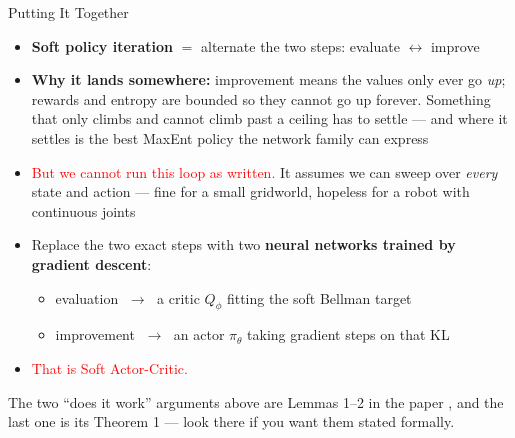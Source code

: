 \begin{frame}{Putting It Together}
\begin{itemize}
    \item \textbf{Soft policy iteration} $=$ alternate the two steps: evaluate $\longleftrightarrow$ improve
    \vspace{0.4em}
    \item \textbf{Why it lands somewhere:} improvement means the values only ever go \emph{up}; rewards and entropy are bounded so they cannot go up forever. Something that only climbs and cannot climb past a ceiling has to settle --- and where it settles is the best MaxEnt policy the network family can express
    \vspace{0.6em}
    \item \textcolor{red}{But we cannot run this loop as written.} It assumes we can sweep over \emph{every} state and action --- fine for a small gridworld, hopeless for a robot with continuous joints
    \vspace{0.4em}
    \item[$\Rightarrow$] Replace the two exact steps with two \textbf{neural networks trained by gradient descent}:
    \begin{itemize}
        \item evaluation $\;\to\;$ a critic $Q_\phi$ fitting the soft Bellman target
        \item improvement $\;\to\;$ an actor $\pi_\theta$ taking gradient steps on that KL
    \end{itemize}
    \item[] \textcolor{red}{That is Soft Actor-Critic.}
\end{itemize}
\vspace{0.1em}
{\footnotesize The two ``does it work'' arguments above are Lemmas 1--2 in the paper , and the last one is its Theorem 1 --- look there if you want them stated formally.}
\end{frame}
